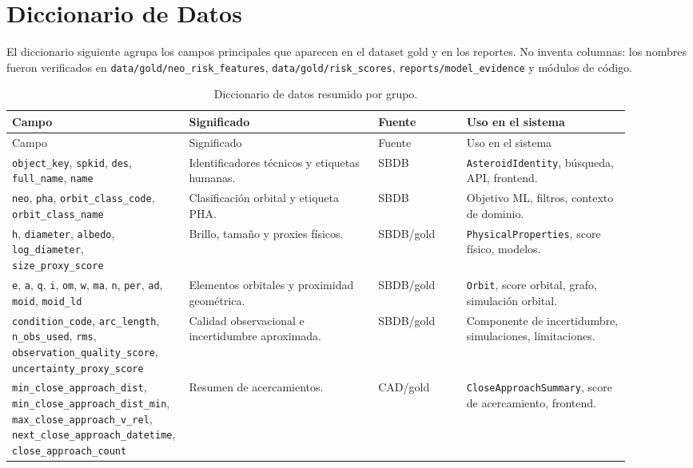 \documentclass[12pt,a4paper]{report}
\newcommand{\code}[1]{\texttt{#1}}
\DeclareRobustCommand{\filepath}[1]{\nolinkurl{#1}}
\begin{document}
\chapter{Diccionario de Datos}

El diccionario siguiente agrupa los campos principales que aparecen en el dataset gold y en los reportes. No inventa columnas: los nombres fueron verificados en \filepath{data/gold/neo_risk_features}, \filepath{data/gold/risk_scores}, \filepath{reports/model_evidence} y módulos de código.

{\footnotesize
\setlength{\tabcolsep}{3.5pt}
\begin{longtable}{>{\RaggedRight\arraybackslash}p{0.20\linewidth}>{\RaggedRight\arraybackslash}p{0.30\linewidth}>{\RaggedRight\arraybackslash}p{0.14\linewidth}>{\RaggedRight\arraybackslash}p{0.26\linewidth}}
\caption{Diccionario de datos resumido por grupo.}\\
\toprule
Campo & Significado & Fuente & Uso en el sistema\\
\midrule
\endfirsthead
\toprule
Campo & Significado & Fuente & Uso en el sistema\\
\midrule
\endhead
\code{object\_key}, \code{spkid}, \code{des}, \code{full\_name}, \code{name} & Identificadores técnicos y etiquetas humanas. & SBDB & \code{AsteroidIdentity}, búsqueda, API, frontend.\\
\code{neo}, \code{pha}, \code{orbit\_class\_code}, \code{orbit\_class\_name} & Clasificación orbital y etiqueta PHA. & SBDB & Objetivo ML, filtros, contexto de dominio.\\
\code{h}, \code{diameter}, \code{albedo}, \code{log\_diameter}, \code{size\_proxy\_score} & Brillo, tamaño y proxies físicos. & SBDB/gold & \code{PhysicalProperties}, score físico, modelos.\\
\code{e}, \code{a}, \code{q}, \code{i}, \code{om}, \code{w}, \code{ma}, \code{n}, \code{per}, \code{ad}, \code{moid}, \code{moid\_ld} & Elementos orbitales y proximidad geométrica. & SBDB/gold & \code{Orbit}, score orbital, grafo, simulación orbital.\\
\code{condition\_code}, \code{arc\_length}, \code{n\_obs\_used}, \code{rms}, \code{observation\_quality\_score}, \code{uncertainty\_proxy\_score} & Calidad observacional e incertidumbre aproximada. & SBDB/gold & Componente de incertidumbre, simulaciones, limitaciones.\\
\code{min\_close\_approach\_dist}, \code{min\_close\_approach\_dist\_min}, \code{max\_close\_approach\_v\_rel}, \code{next\_close\_approach\_datetime}, \code{close\_approach\_count} & Resumen de acercamientos. & CAD/gold & \code{CloseApproachSummary}, score de acercamiento, frontend.\\

\end{longtable}}
\end{document}

